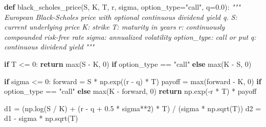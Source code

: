 \documentclass[
  11pt,
]{article}
\newenvironment{Shaded}{}{}
\newcommand{\BuiltInTok}[1]{\textcolor[rgb]{0.00,0.50,0.00}{#1}}
\newcommand{\CommentTok}[1]{\textcolor[rgb]{0.38,0.63,0.69}{\textit{#1}}}
\newcommand{\ControlFlowTok}[1]{\textcolor[rgb]{0.00,0.44,0.13}{\textbf{#1}}}
\newcommand{\DecValTok}[1]{\textcolor[rgb]{0.25,0.63,0.44}{#1}}
\newcommand{\FloatTok}[1]{\textcolor[rgb]{0.25,0.63,0.44}{#1}}
\newcommand{\KeywordTok}[1]{\textcolor[rgb]{0.00,0.44,0.13}{\textbf{#1}}}
\newcommand{\NormalTok}[1]{#1}
\newcommand{\OperatorTok}[1]{\textcolor[rgb]{0.40,0.40,0.40}{#1}}
\newcommand{\StringTok}[1]{\textcolor[rgb]{0.25,0.44,0.63}{#1}}
\begin{document}
\begin{Shaded}
\begin{Highlighting}[]
\KeywordTok{def}\NormalTok{ black\_scholes\_price(S, K, T, r, sigma, option\_type}\OperatorTok{=}\StringTok{"call"}\NormalTok{, q}\OperatorTok{=}\FloatTok{0.0}\NormalTok{):}
    \CommentTok{"""}
\CommentTok{    European Black{-}Scholes price with optional continuous dividend yield q.}
\CommentTok{    S: current underlying price}
\CommentTok{    K: strike}
\CommentTok{    T: maturity in years}
\CommentTok{    r: continuously compounded risk{-}free rate}
\CommentTok{    sigma: annualized volatility}
\CommentTok{    option\_type: \textquotesingle{}call\textquotesingle{} or \textquotesingle{}put\textquotesingle{}}
\CommentTok{    q: continuous dividend yield}
\CommentTok{    """}

    \ControlFlowTok{if}\NormalTok{ T }\OperatorTok{\textless{}=} \DecValTok{0}\NormalTok{:}
        \ControlFlowTok{return} \BuiltInTok{max}\NormalTok{(S }\OperatorTok{{-}}\NormalTok{ K, }\DecValTok{0}\NormalTok{) }\ControlFlowTok{if}\NormalTok{ option\_type }\OperatorTok{==} \StringTok{"call"} \ControlFlowTok{else} \BuiltInTok{max}\NormalTok{(K }\OperatorTok{{-}}\NormalTok{ S, }\DecValTok{0}\NormalTok{)}

    \ControlFlowTok{if}\NormalTok{ sigma }\OperatorTok{\textless{}=} \DecValTok{0}\NormalTok{:}
\NormalTok{        forward }\OperatorTok{=}\NormalTok{ S }\OperatorTok{*}\NormalTok{ np.exp((r }\OperatorTok{{-}}\NormalTok{ q) }\OperatorTok{*}\NormalTok{ T)}
\NormalTok{        payoff }\OperatorTok{=} \BuiltInTok{max}\NormalTok{(forward }\OperatorTok{{-}}\NormalTok{ K, }\DecValTok{0}\NormalTok{) }\ControlFlowTok{if}\NormalTok{ option\_type }\OperatorTok{==} \StringTok{"call"} \ControlFlowTok{else} \BuiltInTok{max}\NormalTok{(K }\OperatorTok{{-}}\NormalTok{ forward, }\DecValTok{0}\NormalTok{)}
        \ControlFlowTok{return}\NormalTok{ np.exp(}\OperatorTok{{-}}\NormalTok{r }\OperatorTok{*}\NormalTok{ T) }\OperatorTok{*}\NormalTok{ payoff}

\NormalTok{    d1 }\OperatorTok{=}\NormalTok{ (np.log(S }\OperatorTok{/}\NormalTok{ K) }\OperatorTok{+}\NormalTok{ (r }\OperatorTok{{-}}\NormalTok{ q }\OperatorTok{+} \FloatTok{0.5} \OperatorTok{*}\NormalTok{ sigma}\OperatorTok{**}\DecValTok{2}\NormalTok{) }\OperatorTok{*}\NormalTok{ T) }\OperatorTok{/}\NormalTok{ (sigma }\OperatorTok{*}\NormalTok{ np.sqrt(T))}
\NormalTok{    d2 }\OperatorTok{=}\NormalTok{ d1 }\OperatorTok{{-}}\NormalTok{ sigma }\OperatorTok{*}\NormalTok{ np.sqrt(T)}


\end{Highlighting}
\end{Shaded}
\end{document}
